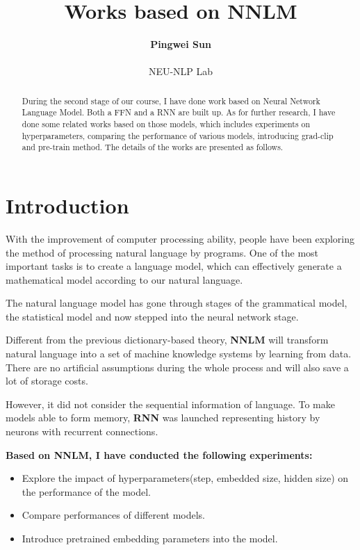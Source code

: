 \documentclass[11pt,a4paper]{article}
\title{Works based on NNLM}
\author{
    \textbf{Pingwei Sun} \\
    \\
    NEU-NLP Lab \\
    }
\date{}
\begin{document}
\maketitle
\begin{abstract}
During the second stage of our course, I have done work based on Neural Network Language Model.
Both a FFN and a RNN are built up.
As for further research, I have done some related works based on those models, which includes 
experiments on hyperparameters, comparing the performance of various models, introducing grad-clip and pre-train method.
The details of the works are presented as follows.

\end{abstract}


\section{Introduction}
With the improvement of computer processing ability, people have been exploring the method of processing natural language by programs.
One of the most important tasks is to create a language model, which can effectively generate a mathematical model according to our natural language.

The natural language model has gone through stages of the grammatical model, the statistical model and now stepped into the neural network stage.

Different from the previous dictionary-based theory, \textbf{NNLM}\citep{bengio2000neural} will transform natural language into a set of machine knowledge systems by learning from data. 
There are no artificial assumptions during the whole process and will also save a lot of storage costs.

However, it did not consider the sequential information of language.
To make models able to form memory, \textbf{RNN}\citep{mikolov2010recurrent} was launched representing history by neurons
with recurrent connections.

\textbf{Based on NNLM, I have conducted the following experiments:}
\begin{itemize}
\item Explore the impact of hyperparameters(step, embedded size, hidden size) on the performance of the model.
\item Compare performances of different models.
\item Introduce pretrained embedding parameters into the model.
\end{itemize}
\end{document}
